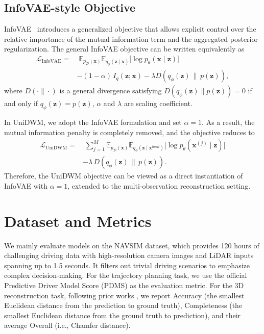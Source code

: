 \documentclass{article}
\theoremstyle{plain}
\theoremstyle{definition}
\theoremstyle{remark}
\begin{document}
\subsection{InfoVAE-style Objective}

InfoVAE~\cite{zhao2017infovae} introduces a generalized objective that allows
explicit control over the relative importance of the mutual information term
and the aggregated posterior regularization. The general InfoVAE objective can
be written equivalently as
\[
\begin{aligned}
\mathcal{L}_{\mathrm{InfoVAE}}
=&\;
\mathbb{E}_{p_{\mathcal{D}}(\mathbf{x})}
\mathbb{E}_{q_\phi(\mathbf{z} \mid \mathbf{x})}
\big[ \log p_\theta(\mathbf{x} \mid \mathbf{z}) \big] \\
&-
(1-\alpha)\, I_q(\mathbf{z}; \mathbf{x}) 
- \lambda D\!\left(
q_\phi(\mathbf{z}) \,\|\, p(\mathbf{z})
\right),
\end{aligned}
\]
where $D(\cdot\|\cdot)$ is a general divergence satisfying
$D(q_\phi(\mathbf{z})\|p(\mathbf{z}))=0$ if and only if
$q_\phi(\mathbf{z})=p(\mathbf{z})$, $\alpha$ and $\lambda$ are scaling coefficient. 

In UniDWM, we adopt the InfoVAE formulation and set $\alpha = 1$.
As a result, the mutual information penalty is completely removed, and the
objective reduces to
\[
\begin{aligned}
\mathcal{L}_{\mathrm{UniDWM}}
=&\;
{\textstyle \sum_{j=1}^{M}}
\mathbb{E}_{p_{\mathcal{D}}(\mathbf{x})}
\mathbb{E}_{q_\phi(\mathbf{z} \mid \mathbf{x}^{local})}
\big[ \log p_\theta(\boldsymbol{x}^{(j)} \mid \mathbf{z}) \big] \\
&-
\lambda\,
D\!\left(
q_\phi(\mathbf{z}) \,\|\, p(\mathbf{z})
\right).
\end{aligned}
\]
Therefore, the UniDWM objective can be viewed as a direct instantiation of
InfoVAE with $\alpha = 1$, extended to the multi-observation reconstruction
setting.

\section{Dataset and Metrics}
\label{dataset_metrics}
We mainly evaluate models on the NAVSIM \cite{navsim} dataset, which provides 120 hours of challenging driving data with high-resolution camera images and LiDAR inputs spanning up to 1.5 seconds. It filters out trivial driving scenarios to emphasize complex decision-making. For the trajectory planning task, we use the official Predictive Driver Model Score (PDMS) as the evaluation metric. For the 3D reconstruction task, following prior works \cite{wang2024dust3r, vggt}, we report Accuracy (the smallest Euclidean distance from the prediction to ground truth), Completeness (the smallest Euclidean distance from the ground truth to prediction), and their average Overall (i.e., Chamfer distance). 
\end{document}
